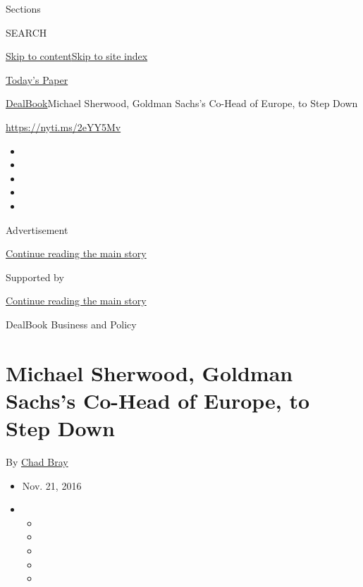 Sections

SEARCH

\protect\hyperlink{site-content}{Skip to
content}\protect\hyperlink{site-index}{Skip to site index}

\href{https://myaccount.nytimes.com/auth/login?response_type=cookie\&client_id=vi}{}

\href{https://www.nytimes.com/section/todayspaper}{Today's Paper}

\href{/section/business/dealbook}{DealBook}\textbar{}Michael Sherwood,
Goldman Sachs's Co-Head of Europe, to Step Down

\url{https://nyti.ms/2eYY5Mv}

\begin{itemize}
\item
\item
\item
\item
\item
\end{itemize}

Advertisement

\protect\hyperlink{after-top}{Continue reading the main story}

Supported by

\protect\hyperlink{after-sponsor}{Continue reading the main story}

DealBook Business and Policy

\hypertarget{michael-sherwood-goldman-sachss-co-head-of-europe-to-step-down}{%
\section{Michael Sherwood, Goldman Sachs's Co-Head of Europe, to Step
Down}\label{michael-sherwood-goldman-sachss-co-head-of-europe-to-step-down}}

By \href{http://www.nytimes.com/by/chad-bray}{Chad Bray}

\begin{itemize}
\item
  Nov. 21, 2016
\item
  \begin{itemize}
  \item
  \item
  \item
  \item
  \item
  \end{itemize}
\end{itemize}

